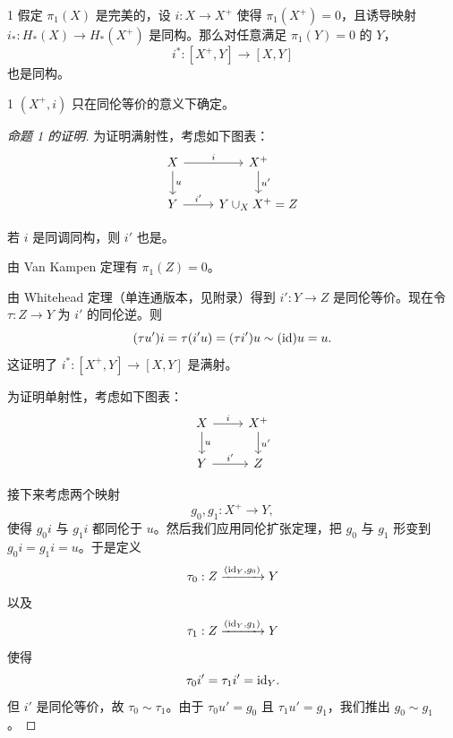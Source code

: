 \begin{prop}{1} 假定 $\pi_1(X)$ 是完美的，设 $i:X\to X^+$ 使得 $\pi_1(X^+)=0$，且诱导映射 $i_*:H_*(X)\to H_*(X^+)$ 是同构。那么对任意满足 $\pi_1(Y)=0$ 的 $Y$，
\[ i^*:[X^+,Y]\to[X,Y] \]
也是同构。 \end{prop}

\begin{cor}{1} $(X^+,i)$ 只在同伦等价的意义下确定。 \end{cor}

\begin{proof}[命题 1 的证明]
为证明满射性，考虑如下图表：
\[
\begin{tikzcd}
X \arrow[r,"i"] \arrow[d,"u"] & X^+ \arrow[d,"u'"] \\
Y \arrow[r,"i'"] & {Y\cup_X X^+=Z}
\end{tikzcd}
\]


若 $i$ 是同调同构，则 $i'$ 也是。

由 Van Kampen 定理有 $\pi_1(Z)=0$。

由 Whitehead 定理（单连通版本，见附录）得到 $i':Y\to Z$ 是同伦等价。现在令 $\tau:Z\to Y$ 为 $i'$ 的同伦逆。则
\[ (\tau u')i=\tau(i'u)=(\tau i')u\sim(\mathrm{id})u=u. \]
这证明了 $i^*:[X^+,Y]\to[X,Y]$ 是满射。

为证明单射性，考虑如下图表：
\[
\begin{tikzcd}
X \arrow[r,"i"] \arrow[d,"u"] & X^+ \arrow[d,"u'"] \\
Y \arrow[r,"i'"] & Z
\end{tikzcd}
\]

接下来考虑两个映射
\[ g_0,g_1:X^+\to Y, \]
使得 $g_0i$ 与 $g_1i$ 都同伦于 $u$。然后我们应用同伦扩张定理，把 $g_0$ 与 $g_1$ 形变到 $g_0i=g_1i=u$。于是定义
\[ \tau_0:Z\xrightarrow{(\mathrm{id}_Y,g_0)}Y \]
以及
\[ \tau_1:Z\xrightarrow{(\mathrm{id}_Y,g_1)}Y \]
使得
\[ \tau_0i'=\tau_1i'=\mathrm{id}_Y. \]
但 $i'$ 是同伦等价，故 $\tau_0\sim\tau_1$。由于 $\tau_0u'=g_0$ 且 $\tau_1u'=g_1$，我们推出 $g_0\sim g_1$。


\end{proof}

